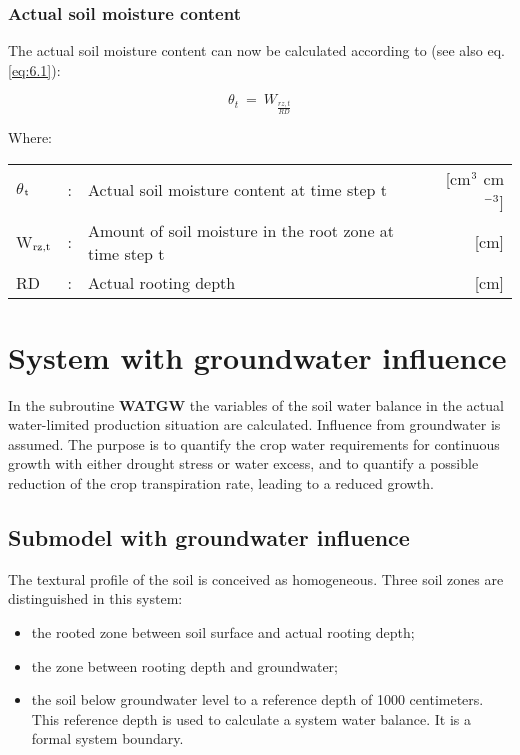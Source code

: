 \subsubsection{Actual soil moisture content}
The actual soil moisture content can now be calculated according to (see also eq. \ref{eq:6.1}):

\begin{equation}
\label{eq:6.34}
\theta _{t} ~=~ W _{\frac{rz, t}{RD}} 
\end{equation}

Where:\\[5pt]
\begin{tabularx}{\textwidth}{llXr}
$\theta$$_{{\rm t}}$ &:& Actual soil moisture content at time step t  & [cm$^{{\rm 3}}$ cm$^{{\rm -3}}$]\\
W$_{{\rm rz,t}}$ &:& Amount of soil moisture in the root zone at time step t  & [cm]\\
RD &:& Actual rooting depth  & [cm]\\
\end{tabularx}


\section{System with groundwater influence  }
\label{sec:WATGW}

In the subroutine {\bf WATGW} the variables of the soil water balance in the actual 
water-limited production situation are calculated. Influence from groundwater is assumed. The
purpose is to quantify the crop water requirements for continuous growth with either
drought stress or water excess, and to quantify a possible reduction of the crop transpiration 
rate, leading to a reduced growth.

\subsection{Submodel with groundwater influence  }

The textural profile of the soil is conceived as homogeneous. Three soil zones are
distinguished in this system:\\

\begin{itemize}
 \item the rooted zone between soil surface and actual rooting depth;
 \item the zone between rooting depth and groundwater;
 \item the soil below groundwater level to a reference depth of 1000 centimeters. This
 reference depth is used to calculate a system water balance. It is a formal system
 boundary.
\end{itemize}
 
